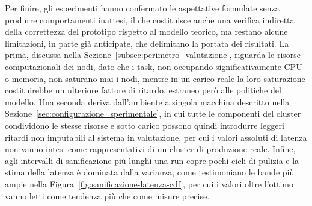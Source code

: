 Per finire, gli esperimenti hanno confermato le aspettative formulate senza produrre comportamenti inattesi, il che costituisce anche una verifica indiretta della correttezza del prototipo rispetto al modello teorico, ma restano alcune limitazioni, in parte già anticipate, che delimitano la portata dei risultati. La prima, discussa nella Sezione~\ref{subsec:perimetro_valutazione}, riguarda le risorse computazionali dei nodi, dato che i task, non occupando significativamente CPU o memoria, non saturano mai i nodi, mentre in un carico reale la loro saturazione costituirebbe un ulteriore fattore di ritardo, estraneo però alle politiche del modello. Una seconda deriva dall'ambiente a singola macchina descritto nella Sezione~\ref{sec:configurazione_sperimentale}, in cui tutte le componenti del cluster condividono le stesse risorse e sotto carico possono quindi introdurre leggeri ritardi non imputabili al sistema in valutazione, per cui i valori assoluti di latenza non vanno intesi come rappresentativi di un cluster di produzione reale. Infine, agli intervalli di sanificazione più lunghi una run copre pochi cicli di pulizia e la stima della latenza è dominata dalla varianza, come testimoniano le bande più ampie nella Figura~\ref{fig:sanificazione-latenza-cdf}, per cui i valori oltre l'ottimo vanno letti come tendenza più che come misure precise.